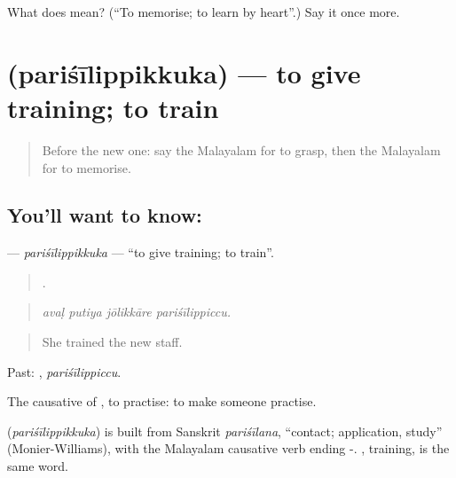 \begin{tcolorbox}[breakable,colback=teal!4,colframe=teal!35!black,title={Before you move on}]
What does  mean? (\textquotedblleft{}To memorise; to learn by heart\textquotedblright{}.) Say it once more.
\end{tcolorbox}
\section[\texorpdfstring{\ml{പരിശീലിപ്പിക്കുക} (pariśīlippikkuka)}{പരിശീലിപ്പിക്കുക (pariśīlippikkuka)}]{ (pariśīlippikkuka) — to give training; to train}

\label{lesson:ML-C438-parisilippikkuka}



\begin{quote}
Before the new one: say the Malayalam for to grasp, then the Malayalam for to memorise.
\end{quote}

\subsection*{You'll want to know: }
\textbf{} — \emph{pariśīlippikkuka} — \textquotedblleft{}to give training; to train\textquotedblright{}.

\begin{quote}
   .
\end{quote}

\begin{quote}
\emph{avaḷ putiya jōlikkāre pariśīlippiccu.}
\end{quote}

\begin{quote}
She trained the new staff.
\end{quote}

Past: , \emph{pariśīlippiccu}.

The causative of , to practise: to make someone practise.

\begin{cousinweb}
\textbf{} (\emph{pariśīlippikkuka}) is built from Sanskrit \emph{pariśīlana}, \textquotedblleft{}contact; application, study\textquotedblright{} (Monier-Williams), with the Malayalam causative verb ending -. , training, is the same word.
\end{cousinweb}

